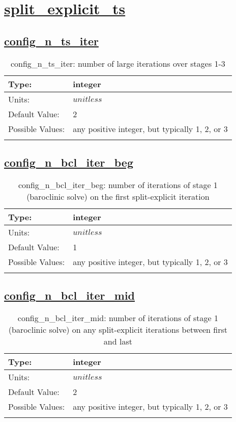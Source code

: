 \section[split\_explicit\_ts]{\hyperref[sec:nm_tab_split_explicit_ts]{split\_explicit\_ts}}
\label{sec:nm_sec_split_explicit_ts}
\subsection[config\_n\_ts\_iter]{\hyperref[sec:nm_tab_split_explicit_ts]{config\_n\_ts\_iter}}
\label{subsec:nm_sec_config_n_ts_iter}
\begin{center}
\begin{longtable}{| p{2.0in} | p{4.0in} |}
    \hline
    Type: & integer \\
    \hline
    Units: & $unitless$ \\
    \hline
    Default Value: & 2 \\
    \hline
    Possible Values: & any positive integer, but typically 1, 2, or 3 \\
    \hline
    \caption{config\_n\_ts\_iter: number of large iterations over stages 1-3}
\end{longtable}
\end{center}
\subsection[config\_n\_bcl\_iter\_beg]{\hyperref[sec:nm_tab_split_explicit_ts]{config\_n\_bcl\_iter\_beg}}
\label{subsec:nm_sec_config_n_bcl_iter_beg}
\begin{center}
\begin{longtable}{| p{2.0in} | p{4.0in} |}
    \hline
    Type: & integer \\
    \hline
    Units: & $unitless$ \\
    \hline
    Default Value: & 1 \\
    \hline
    Possible Values: & any positive integer, but typically 1, 2, or 3 \\
    \hline
    \caption{config\_n\_bcl\_iter\_beg: number of iterations of stage 1 (baroclinic solve) on the first split-explicit iteration}
\end{longtable}
\end{center}
\subsection[config\_n\_bcl\_iter\_mid]{\hyperref[sec:nm_tab_split_explicit_ts]{config\_n\_bcl\_iter\_mid}}
\label{subsec:nm_sec_config_n_bcl_iter_mid}
\begin{center}
\begin{longtable}{| p{2.0in} | p{4.0in} |}
    \hline
    Type: & integer \\
    \hline
    Units: & $unitless$ \\
    \hline
    Default Value: & 2 \\
    \hline
    Possible Values: & any positive integer, but typically 1, 2, or 3 \\
    \hline
    \caption{config\_n\_bcl\_iter\_mid: number of iterations of stage 1 (baroclinic solve) on any split-explicit iterations between first and last}
\end{longtable}
\end{center}
